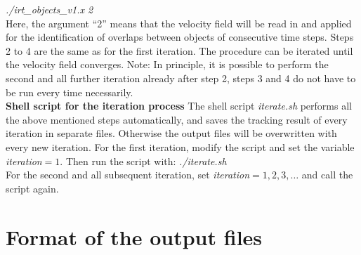 \documentclass[11pt]{article}
\begin{document}
{\it ./irt\_objects\_v1.x 2}\\
Here, the argument ``2'' means that the velocity field will be read in and applied for the identification of overlaps between objects of consecutive time steps. Steps 2 to 4 are the same as for the first iteration. The procedure can be iterated until the velocity field converges. Note: In principle, it is possible to perform the second and all further iteration already after step 2, steps 3 and 4 do not have to be run every time necessarily.\vspace{0.5cm}\\
{\bf Shell script for the iteration process}
The shell script {\it iterate.sh} performs all the above mentioned steps automatically, and saves the tracking result of every iteration in separate files. Otherwise the output files will be overwritten with every new iteration. For the first iteration, modify the script and set the variable {\it iteration$=1$}. Then run the script with:
{\it ./iterate.sh}\\
For the second and all subsequent iteration, set {\it iteration$=1,2,3,\ldots$} and call the script again.

\section{Format of the output files}
\end{document}
